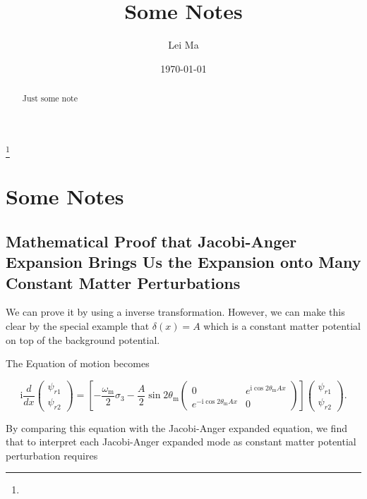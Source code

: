 \documentclass[%
 aip,
rsi,%
 amsmath,amssymb,
preprint,%
]{revtex4-1}
\begin{document}
\preprint{}

\title[Some Notes]{Some Notes}%
\thanks{}

\author{Lei Ma}
 
\date{\today}%

\begin{abstract}
Just some note

\end{abstract}

\maketitle



\section{Some Notes}


\subsection{Mathematical Proof that Jacobi-Anger Expansion Brings Us the Expansion onto Many Constant Matter Perturbations}


We can prove it by using a inverse transformation. However, we can make this clear by the special example that $\delta(x)=A$ which is a constant matter potential on top of the background potential.

The Equation of motion becomes

\begin{equation}
\mathrm i \frac{d}{dx}\begin{pmatrix}
\psi_{r1}\\
\psi_{r2}
\end{pmatrix} =
\left[ -\frac{\omega_{\mathrm m}}{2} \sigma_3 - \frac{A}{2} \sin 2\theta_{\mathrm m} \begin{pmatrix}
0 & e^{\mathrm i \cos 2\theta_{\mathrm m} A x } \\
 e^{-\mathrm i \cos 2\theta_{\mathrm m} A x } & 0
\end{pmatrix} \right] \begin{pmatrix}
\psi_{r1}\\
\psi_{r2}
\end{pmatrix}.
\end{equation}


By comparing this equation with the Jacobi-Anger expanded equation, we find that to interpret each Jacobi-Anger expanded mode as constant matter potential perturbation requires
\end{document}
